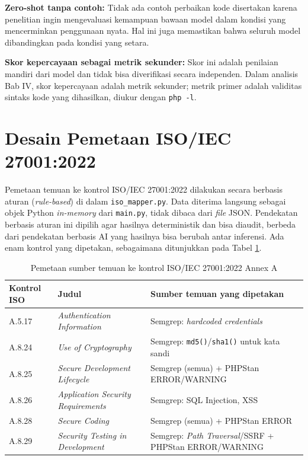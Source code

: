 \textbf{Zero-shot tanpa contoh:} Tidak ada contoh perbaikan kode disertakan karena penelitian ingin mengevaluasi kemampuan bawaan model dalam kondisi yang mencerminkan penggunaan nyata. Hal ini juga memastikan bahwa seluruh model dibandingkan pada kondisi yang setara.

\textbf{Skor kepercayaan sebagai metrik sekunder:} Skor ini adalah penilaian mandiri dari model dan tidak bisa diverifikasi secara independen. Dalam analisis Bab IV, skor kepercayaan adalah metrik sekunder; metrik primer adalah validitas sintaks kode yang dihasilkan, diukur dengan \texttt{php -l}.


\section{Desain Pemetaan ISO/IEC 27001:2022}

\label{sec:iso-mapping-design}

\begin{sloppypar}

Pemetaan temuan ke kontrol ISO/IEC 27001:2022 dilakukan secara berbasis 
aturan (\textit{rule-based}) di dalam \texttt{iso\_mapper.py}. 
Data diterima langsung sebagai objek Python \textit{in-memory} dari \texttt{main.py}, 
tidak dibaca dari \textit{file} JSON. Pendekatan berbasis aturan ini dipilih agar hasilnya deterministik dan bisa diaudit, berbeda dari pendekatan berbasis AI yang hasilnya bisa berubah antar inferensi. Ada enam kontrol yang dipetakan, sebagaimana ditunjukkan pada Tabel \ref{tab:iso-mapping}.

\end{sloppypar}
\begin{table}[htbp]
\caption{Pemetaan sumber temuan ke kontrol ISO/IEC 27001:2022 Annex A}
\vspace{0.5em}
\centering
\label{tab:iso-mapping}
\renewcommand{\arraystretch}{1.4}
\begin{tabularx}{\textwidth}{|l|l|>{\raggedright\arraybackslash}X|}
\hline
\textbf{Kontrol ISO} & \textbf{Judul} & \textbf{Sumber temuan yang dipetakan} \\
\hline \hline
A.5.17 & \textit{Authentication Information} & Semgrep: \textit{hardcoded credentials} \\
\hline
A.8.24 & \textit{Use of Cryptography} & Semgrep: \texttt{md5()}/\texttt{sha1()} untuk kata sandi \\
\hline
A.8.25 & \textit{Secure Development Lifecycle} & Semgrep (semua) + PHPStan ERROR/WARNING \\
\hline
A.8.26 & \textit{Application Security Requirements} & Semgrep: SQL Injection, XSS \\
\hline
A.8.28 & \textit{Secure Coding} & Semgrep (semua) + PHPStan ERROR \\
\hline
A.8.29 & \textit{Security Testing in Development} &
Semgrep: \textit{Path Traversal}/SSRF + PHPStan ERROR/WARNING \\
\hline
\end{tabularx}
\end{table}


